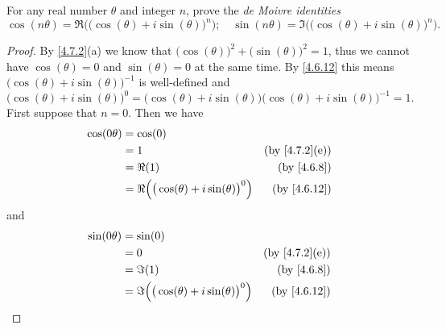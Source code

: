 \begin{exercise}\label{ex 4.7.7}
  For any real number \(\theta\) and integer \(n\), prove the \emph{de Moivre identities}
  \[
    \cos(n \theta) = \Re\Big(\big(\cos(\theta) + i \sin(\theta)\big)^n\Big); \quad \sin(n \theta) = \Im\Big(\big(\cos(\theta) + i \sin(\theta)\big)^n\Big).
  \]
\end{exercise}

\begin{proof}
  By \cref{4.7.2}(a) we know that \(\big(\cos(\theta)\big)^2 + \big(\sin(\theta)\big)^2 = 1\), thus we cannot have \(\cos(\theta) = 0\) and \(\sin(\theta) = 0\) at the same time.
  By \cref{4.6.12} this means \(\big(\cos(\theta) + i \sin(\theta)\big)^{-1}\) is well-defined and
  \[
    \big(\cos(\theta) + i \sin(\theta)\big)^0 = \big(\cos(\theta) + i \sin(\theta)\big) \big(\cos(\theta) + i \sin(\theta)\big)^{-1} = 1.
  \]
  First suppose that \(n = 0\).
  Then we have
  \begin{align*}
    \cos(0 \theta) & = \cos(0)                                                                              \\
                   & = 1                                                      & \text{(by \cref{4.7.2}(e))} \\
                   & = \Re(1)                                                 & \text{(by \cref{4.6.8})}    \\
                   & = \Re\Big(\big(\cos(\theta) + i \sin(\theta)\big)^0\Big) & \text{(by \cref{4.6.12})}
  \end{align*}
  and
  \begin{align*}
    \sin(0 \theta) & = \sin(0)                                                                              \\
                   & = 0                                                      & \text{(by \cref{4.7.2}(e))} \\
                   & = \Im(1)                                                 & \text{(by \cref{4.6.8})}    \\
                   & = \Im\Big(\big(\cos(\theta) + i \sin(\theta)\big)^0\Big) & \text{(by \cref{4.6.12})}
  \end{align*}


\end{proof}
